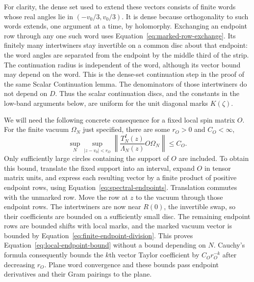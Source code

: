 For clarity, the dense set used to extend these vectors consists
of finite words whose real angles lie in $(-v_0/3,v_0/3)$.
It is dense because orthogonality to such words extends, one
argument at a time, by holomorphy.  Exchanging an endpoint row
through any one such word uses
Equation~\eqref{eq:marked-row-exchange}.  Its finitely many
intertwiners stay invertible on a common disc about that endpoint:
the word angles are separated from the endpoint by the middle
third of the strip.  The continuation radius is independent of
the word, although its vector bound may depend on the word.
This is the dense-set continuation step in the proof of the same
Scalar Continuation lemma.  The denominators of those intertwiners
do not depend on $D$.  Thus the scalar continuation discs, and
the constants in the low-band arguments below, are uniform for
the unit diagonal marks $K(\zeta)$.

We will need the following concrete consequence for a fixed local
spin matrix $O$.  For the finite vacuum $\Omega_N$ just specified,
there are
some $r_O>0$ and $C_O<\infty$,
\begin{equation}\label{eq:local-endpoint-bound}
 \sup_N\sup_{|z-v_0|<r_O}
 \left\|\frac{T_N^I(z)}{\Lambda_N(z)}O\Omega_N\right\|
 \le C_O.
\end{equation}
Only sufficiently large circles containing the support of $O$
are included.  To obtain this bound, translate the fixed support
into an interval, expand $O$ in tensor matrix units, and express
each resulting vector by a finite product of positive endpoint
rows, using Equation~\eqref{eq:spectral-endpoints}.  Translation
commutes with the unmarked row.  Move the row at $z$ to the
vacuum through those endpoint rows.  The intertwiners are now
near $R(0)$, the invertible swap, so their coefficients are
bounded on a sufficiently small disc.  The remaining endpoint
rows are bounded shifts with local marks, and the marked vacuum
vector is bounded by Equation~\eqref{eq:finite-endpoint-division}.
This proves Equation~\eqref{eq:local-endpoint-bound} without a
bound depending on $N$.  Cauchy's formula consequently bounds
the $k$th vector Taylor coefficient by $C_O r_O^{-k}$ after
decreasing $r_O$.  Plane word convergence and these bounds pass
endpoint derivatives and their Gram pairings to the plane.

